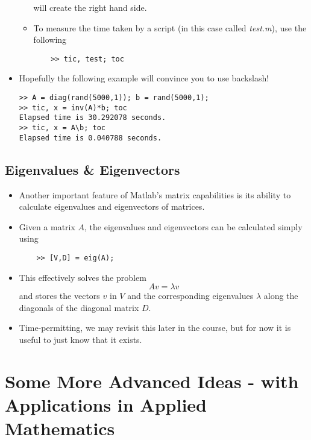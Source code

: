 \documentclass[12pt]{report}
\begin{document}
\begin{itemize}
\begin{tcolorbox}[title=Task]
\begin{itemize}
	will create the right hand side.
	\item 	To measure the time taken by a script (in this case called \textit{test.m}), use the following
	\begin{lstlisting}
	>> tic, test; toc
	\end{lstlisting}
	\end{itemize}
\end{tcolorbox}
\item Hopefully the following example will convince you to use backslash! 
\begin{lstlisting}
>> A = diag(rand(5000,1)); b = rand(5000,1);
>> tic, x = inv(A)*b; toc
Elapsed time is 30.292078 seconds.
>> tic, x = A\b; toc
Elapsed time is 0.040788 seconds.
\end{lstlisting}
\end{itemize}

\subsection*{Eigenvalues \& Eigenvectors}

\begin{itemize}
	\item Another important feature of Matlab's matrix capabilities is its ability to calculate eigenvalues and eigenvectors of matrices.
	\item Given a matrix $A$, the eigenvalues and eigenvectors can be calculated simply using
	\begin{lstlisting}
	>> [V,D] = eig(A);
	\end{lstlisting}
	\item This effectively solves the problem
	\begin{displaymath}
	Av = \lambda v
	\end{displaymath}
	and stores the vectors $v$ in $V$ and the corresponding eigenvalues $\lambda$ along the diagonals of the diagonal matrix $D$.
	\item Time-permitting, we may revisit this later in the course, but for now it is useful to just know that it exists.
\end{itemize}


\section*{Some More Advanced Ideas - with Applications in Applied Mathematics}
\end{document}
